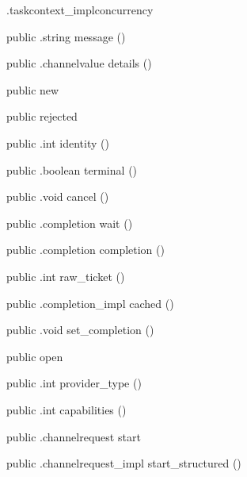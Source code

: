 \begin{CrexxClass}{.taskcontext\_impl}{concurrency}
\begin{Members}
    \Method
      {public}
      {.string}
      {message}
      {()}

    \Method
      {public}
      {.channelvalue}
      {details}
      {()}

    \Factory
      {public}
      {new}
      {}

    \Factory
      {public}
      {rejected}
      {}

    \Method
      {public}
      {.int}
      {identity}
      {()}

    \Method
      {public}
      {.boolean}
      {terminal}
      {()}

    \Method
      {public}
      {.void}
      {cancel}
      {()}

    \Method
      {public}
      {.completion}
      {wait}
      {()}

    \Method
      {public}
      {.completion}
      {completion}
      {()}

    \Method
      {public}
      {.int}
      {raw\_ticket}
      {()}

    \Method
      {public}
      {.completion\_impl}
      {cached}
      {()}

    \Method
      {public}
      {.void}
      {set\_completion}
      {()}

    \Factory
      {public}
      {open}
      {}

    \Method
      {public}
      {.int}
      {provider\_type}
      {()}

    \Method
      {public}
      {.int}
      {capabilities}
      {()}

    \Method
      {public}
      {.channelrequest}
      {start}
      {}

    \Method
      {public}
      {.channelrequest\_impl}
      {start\_structured}
      {()}


\end{Members}
\end{CrexxClass}
